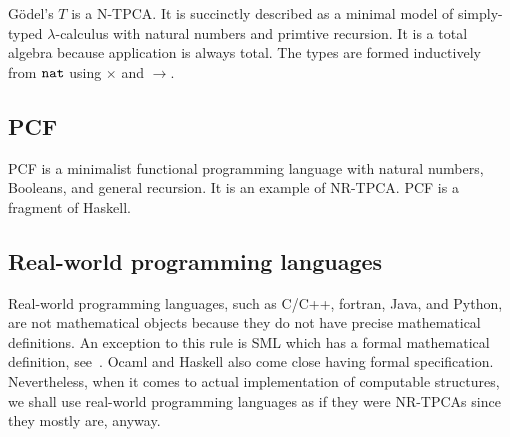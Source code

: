 G\"odel's $T$ is a N-TPCA. It is succinctly described as a minimal
model of simply-typed $\lambda$-calculus with natural numbers and
primtive recursion. It is a total algebra because application is
always total. The types are formed inductively from $\mathtt{nat}$ using
$\times$ and $\to$.

\subsection{PCF}

PCF is a minimalist functional programming language with natural
numbers, Booleans, and general recursion. It is an example of NR-TPCA.
PCF is a fragment of Haskell.


\subsection{Real-world programming languages}
\label{sec:programming-languages}

Real-world programming languages, such as C/C++, fortran, Java, and
Python, are not mathematical objects because they do not have precise
mathematical definitions. An exception to this rule is SML which has a
formal mathematical definition, see~\cite{MilnerR:defsml}. Ocaml and
Haskell also come close having formal specification. Nevertheless,
when it comes to actual implementation of computable structures, we
shall use real-world programming languages as if they were NR-TPCAs
since they mostly are, anyway.



